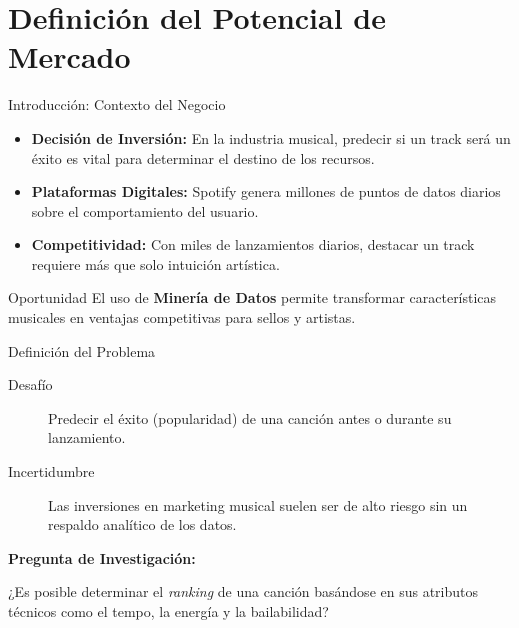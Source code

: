 \documentclass[10pt, xcolor=x11names,compress]{beamer}
\begin{document}
\section{Definición del Potencial de Mercado}
\begin{frame}{Introducción: Contexto del Negocio}
    \begin{itemize}
        \item <1-> \textbf{Decisión de Inversión:} En la industria musical, predecir si un track será un éxito es vital para determinar el destino de los recursos.
        \vspace{0.8em}
        \item <1-> \textbf{Plataformas Digitales:} Spotify genera millones de puntos de datos diarios sobre el comportamiento del usuario.
        \vspace{0.8em}
        \item <1-> \textbf{Competitividad:} Con miles de lanzamientos diarios, destacar un track requiere más que solo intuición artística.
    \end{itemize}
    \vspace{1em}
    \begin{block}{Oportunidad}
        El uso de \textbf{Minería de Datos} permite transformar características musicales en ventajas competitivas para sellos y artistas.
    \end{block}
\end{frame}
\begin{frame}{Definición del Problema}
    \begin{description}
        \item[Desafío] Predecir el éxito (popularidad) de una canción antes o durante su lanzamiento. 
        \item[Incertidumbre] Las inversiones en marketing musical suelen ser de alto riesgo sin un respaldo analítico de los datos.
    \end{description}
    
    \vspace{1em}
    \textbf{Pregunta de Investigación:}
    \vspace{0.5em}
    \par¿Es posible determinar el \textit{ranking} de una canción basándose en sus atributos técnicos como el tempo, la energía y la bailabilidad?
\end{frame}
\end{document}
